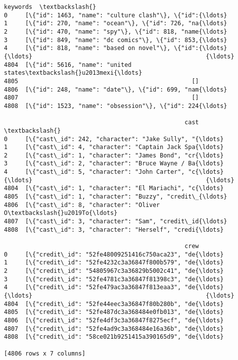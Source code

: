 \documentclass[11pt]{article}
\begin{document}
\begin{tcolorbox}[breakable, size=fbox, boxrule=.5pt, pad at break*=1mm, opacityfill=0]
\begin{Verbatim}[commandchars=\\\{\}]
                                               keywords  \textbackslash{}
0     [\{"id": 1463, "name": "culture clash"\}, \{"id":{\ldots}
1     [\{"id": 270, "name": "ocean"\}, \{"id": 726, "na{\ldots}
2     [\{"id": 470, "name": "spy"\}, \{"id": 818, "name{\ldots}
3     [\{"id": 849, "name": "dc comics"\}, \{"id": 853,{\ldots}
4     [\{"id": 818, "name": "based on novel"\}, \{"id":{\ldots}
{\ldots}                                                 {\ldots}
4804  [\{"id": 5616, "name": "united states\textbackslash{}u2013mexi{\ldots}
4805                                                 []
4806  [\{"id": 248, "name": "date"\}, \{"id": 699, "nam{\ldots}
4807                                                 []
4808  [\{"id": 1523, "name": "obsession"\}, \{"id": 224{\ldots}

                                                   cast  \textbackslash{}
0     [\{"cast\_id": 242, "character": "Jake Sully", "{\ldots}
1     [\{"cast\_id": 4, "character": "Captain Jack Spa{\ldots}
2     [\{"cast\_id": 1, "character": "James Bond", "cr{\ldots}
3     [\{"cast\_id": 2, "character": "Bruce Wayne / Ba{\ldots}
4     [\{"cast\_id": 5, "character": "John Carter", "c{\ldots}
{\ldots}                                                 {\ldots}
4804  [\{"cast\_id": 1, "character": "El Mariachi", "c{\ldots}
4805  [\{"cast\_id": 1, "character": "Buzzy", "credit\_{\ldots}
4806  [\{"cast\_id": 8, "character": "Oliver O\textbackslash{}u2019To{\ldots}
4807  [\{"cast\_id": 3, "character": "Sam", "credit\_id{\ldots}
4808  [\{"cast\_id": 3, "character": "Herself", "credi{\ldots}

                                                   crew
0     [\{"credit\_id": "52fe48009251416c750aca23", "de{\ldots}
1     [\{"credit\_id": "52fe4232c3a36847f800b579", "de{\ldots}
2     [\{"credit\_id": "54805967c3a36829b5002c41", "de{\ldots}
3     [\{"credit\_id": "52fe4781c3a36847f81398c3", "de{\ldots}
4     [\{"credit\_id": "52fe479ac3a36847f813eaa3", "de{\ldots}
{\ldots}                                                 {\ldots}
4804  [\{"credit\_id": "52fe44eec3a36847f80b280b", "de{\ldots}
4805  [\{"credit\_id": "52fe487dc3a368484e0fb013", "de{\ldots}
4806  [\{"credit\_id": "52fe4df3c3a36847f8275ecf", "de{\ldots}
4807  [\{"credit\_id": "52fe4ad9c3a368484e16a36b", "de{\ldots}
4808  [\{"credit\_id": "58ce021b9251415a390165d9", "de{\ldots}

[4806 rows x 7 columns]
\end{Verbatim}
\end{tcolorbox}
        
\end{document}
